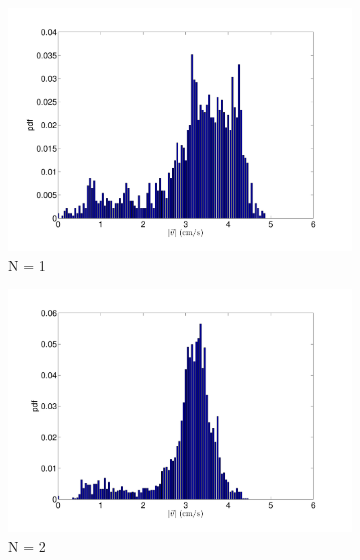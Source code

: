 \documentclass[12pt]{article}
\begin{document}
\begin{figure}[h!]
	\begin{subfigure}[h!]{0.5\textwidth}
    \centering
       \includegraphics[scale=0.28]{cb_1_3mm_60mm_v_pdf.pdf}
       \caption{N = 1}
       \label{fig:vpdf_1}
	\end{subfigure}
	\hfill
	\begin{subfigure}[h!]{0.5\textwidth}
    \centering
       \includegraphics[scale=0.28]{cb_2_3mm_60mm_v_pdf.pdf}
       \caption{N = 2}
       \label{fig:vpdf_2}
	\end{subfigure}
	\begin{subfigure}[h!]{0.5\textwidth}
    \centering

\end{subfigure}
\end{figure}
\end{document}
